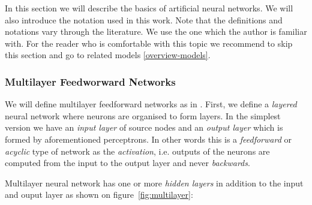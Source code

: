 
\newcommand{\argmin}{\operatornamewithlimits{arg\,min}}
\newcommand{\Bx}{{\bf x}}
\newcommand{\By}{{\bf y}}
\newcommand{\Bh}{{\bf h}}
\newcommand{\Bw}{{\bf w}}
\newcommand{\Bc}{{\bf c}}

In this section we will describe the basics of artificial neural networks. We will also introduce the notation used in this work. Note that the definitions and notations vary through the literature. We use the one which the author is familiar with. For the reader who is comfortable with this topic we recommend to skip this section and go to related models \ref{overview-models}. 

 
\label{sec:perceptron} 

\subsubsection{Multilayer Feedworward Networks} 
\label{sec:multilayer} 

We will define multilayer feedforward networks as in \citet{haykin1994neural}. First, we define a \emph{layered} neural network where neurons are organised to form layers. In the simplest version we have an \emph{input layer} of source nodes and an \emph{output layer} which is formed by aforementioned perceptrons. In other words this is a \emph{feedforward} or \emph{acyclic} type of network as the \emph{activation}, i.e. outputs of the neurons are computed from the input to the output layer and never \emph{backwards}. 

Multilayer neural network has one or more \emph{hidden layers} in addition to the input and ouput layer as shown on figure~\ref{fig:multilayer}: 

